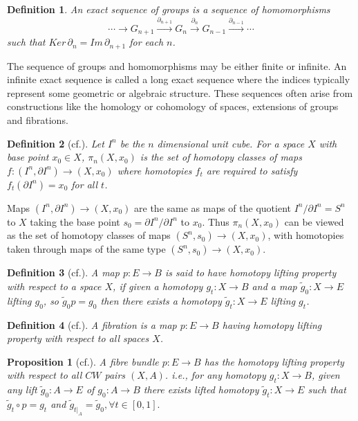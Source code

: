 \documentclass{amsart}
\theoremstyle{plain}
\newtheorem{prop}{Proposition}
\newtheorem{defn}{Definition}
\begin{document}
\begin{defn}
	An exact sequence  of groups is a sequence of homomorphisms
	$$ \cdots  \longrightarrow G_{n+1}  \stackrel{\partial_{n+1}}{\longrightarrow} G_n  \stackrel{\partial_{n}}{\longrightarrow} G_{n-1}  \stackrel{\partial_{n-1}}{\longrightarrow} \cdots$$ 
	such that $Ker \, \partial_{n} = Im \, \partial_{n+1} $ for each $n$.
	
\end{defn} 
The sequence of groups and homomorphisms may be either finite or infinite. An infinite exact sequence is called a long exact sequence where the indices typically represent some geometric or algebraic structure. These sequences often arise from constructions like the homology or cohomology of spaces, extensions of groups and fibrations.
\begin{defn}[cf.\cite{Allen}]
	Let $I^n$ be the $n$ dimensional unit cube. For a space $X$ with base point $x_0 \in X$, $\pi_n(X,x_0)$  is the set of homotopy classes of maps $f: (I^n, \partial I^n) \rightarrow (X,x_0)$ where homotopies $f_t$ are required to satisfy $f_t(\partial I^n)= x_0$ for all $t$.
\end{defn}
Maps $(I^n, \partial I^n) \rightarrow (X,x_0)$ are the same as maps of the quotient $I^n/ \partial I^n= S^n$ to $X$ taking the base point $s_0 =  \partial I^n/ \partial I^n$ to $x_0$. Thus $\pi_n(X,x_0)$ can be viewed as the set of homotopy classes of maps $(S^n, s_0) \rightarrow (X, x_0)$, with homotopies taken through maps of the same type  $(S^n, s_0) \rightarrow (X, x_0)$.

\begin{defn}[cf.\cite{Allen}]
	A map $p: E \rightarrow B$ is said to have homotopy lifting property  with respect to a space $X$, if given a homotopy $g_t : X \rightarrow B$ and a map $ \tilde{g}_0 : X \rightarrow E$ lifting $g_0$, so $ \tilde{g}_0 p= g_0$ then there exists a homotopy $ \tilde{g}_t : X \rightarrow E$ lifting $g_t$.
\end{defn}
\begin{defn}[cf.\cite{Allen}]
	A fibration is a map $p: E \rightarrow B$ having homotopy lifting property with respect to all spaces $X$.
\end{defn}


\begin{prop}[cf.\cite{Allen}]
	A fibre bundle $ p:E \rightarrow B$ has the homotopy lifting property with respect to all $CW$ pairs $(X, A)$. i.e., for any homotopy $g_t: X \rightarrow B$, given any lift $\tilde{g}_0 :A \rightarrow E$ of $g_0 : A \rightarrow B$ there exists lifted homotopy $\tilde{g}_t : X \rightarrow E$ such that $\tilde{g}_t \circ p = g_t$ and $\tilde{g}_{t|_A} = \tilde{g}_0, \forall t \in [0,1].$
\end{prop}
\end{document}
